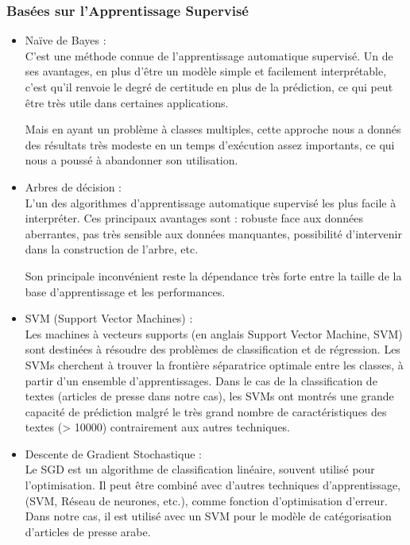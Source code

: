     \subsubsection{Basées sur l'Apprentissage Supervisé}
        \begin{itemize}
            \item{Naïve de Bayes : }\\
            C'est une méthode connue de l'apprentissage automatique supervisé. Un de ses avantages, en plus d'être un modèle simple et facilement interprétable, c'est qu'il renvoie le degré de certitude en plus de la prédiction, ce qui peut être très utile dans certaines applications. 

            Mais en ayant un problème à classes multiples, cette approche nous a donnés des résultats très modeste en un temps d'exécution assez importants, ce qui nous a poussé à abandonner son utilisation.\\
            
            \item{Arbres de décision : }\\
            L'un des algorithmes d'apprentissage automatique supervisé les plus facile à interpréter. Ces principaux avantages sont : robuste face aux données aberrantes, pas très sensible aux données manquantes, possibilité d'intervenir dans la construction de l'arbre, etc. 

            Son principale inconvénient reste la dépendance très forte entre la taille de la base d'apprentissage et les performances.\\
            
            \item{SVM (Support Vector Machines) : }\\
            Les machines à vecteurs supports (en anglais Support Vector Machine, SVM) sont destinées à résoudre des problèmes de classification et de régression. Les SVMs cherchent à trouver la frontière séparatrice optimale entre les classes, à partir d'un ensemble d'apprentissages. Dans le cas de la classification de textes (articles de presse dans notre cas), les SVMs ont montrés une grande capacité de prédiction malgré le très grand nombre de caractéristiques des textes (> 10000) contrairement aux autres techniques.\\ 
            
            \item{Descente de Gradient Stochastique : }\\
            Le SGD est un algorithme de classification linéaire, souvent utilisé pour l'optimisation. Il peut être combiné avec d'autres techniques d'apprentissage, (SVM, Réseau de neurones, etc.), comme  fonction d'optimisation d'erreur. Dans notre cas, il est utilisé avec un SVM pour le modèle de catégorisation d'articles de presse arabe.
        \end{itemize}

